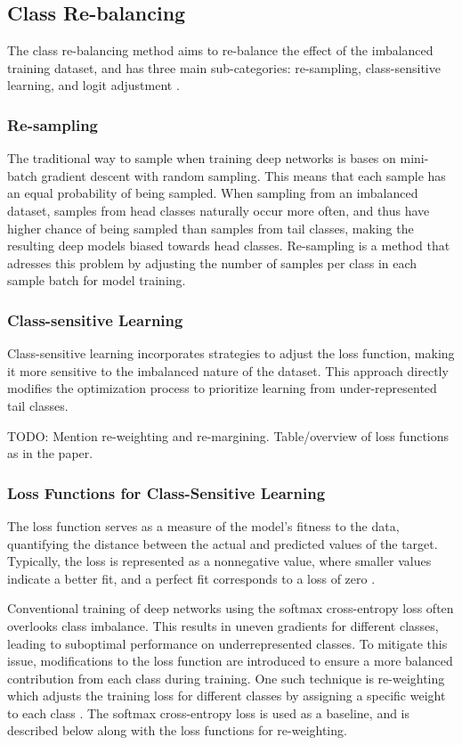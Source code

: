 \subsection{Class Re-balancing}
The class re-balancing method aims to re-balance the effect of the imbalanced training dataset, and has three main sub-categories: re-sampling, class-sensitive learning, and logit adjustment \cite{zhang2023deep}. 

\subsubsection{Re-sampling}
The traditional way to sample when training deep networks is bases on mini-batch gradient descent with random sampling. This means that each sample has an equal probability of being sampled. When sampling from an imbalanced dataset, samples from head classes naturally occur more often, and thus have higher chance of being sampled than samples from tail classes, making the resulting deep models biased towards head classes. Re-sampling is a method that adresses this problem by adjusting the number of samples per class in each sample batch for model training. 

\subsubsection{Class-sensitive Learning}
Class-sensitive learning incorporates strategies to adjust the loss function, making it more sensitive to the imbalanced nature of the dataset. This approach directly modifies the optimization process to prioritize learning from under-represented tail classes.

TODO: Mention re-weighting and re-margining.
Table/overview of loss functions as in the paper.


\subsubsection{Loss Functions for Class-Sensitive Learning}

The loss function serves as a measure of the model's fitness to the data, quantifying the distance between the actual and predicted values of the target. Typically, the loss is represented as a nonnegative value, where smaller values indicate a better fit, and a perfect fit corresponds to a loss of zero \cite{zhang2023dive}.

Conventional training of deep networks using the softmax cross-entropy loss often overlooks class imbalance. This results in uneven gradients for different classes, leading to suboptimal performance on underrepresented classes. To mitigate this issue, modifications to the loss function are introduced to ensure a more balanced contribution from each class during training. One such technique is re-weighting which adjusts the training loss for different classes by assigning a specific weight to each class \cite{zhang2023deep}. The softmax cross-entropy loss is used as a baseline, and is described below along with the loss functions for re-weighting.

